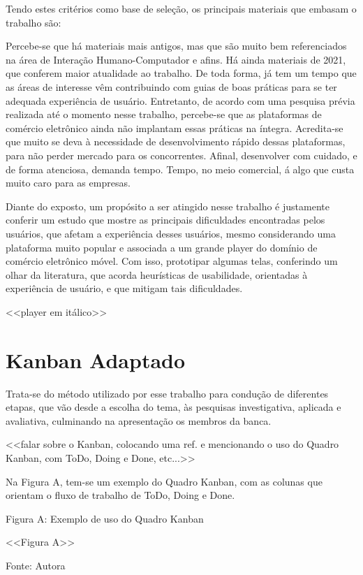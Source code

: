 Tendo estes critérios como base de seleção, os principais materiais que embasam o trabalho são:

Percebe-se que há materiais mais antigos, mas que são muito bem referenciados na área de Interação Humano-Computador e afins. Há ainda materiais de 2021, que conferem maior atualidade ao trabalho. De toda forma, já tem um tempo que as áreas de interesse vêm contribuindo com guias de boas práticas para se ter adequada experiência de usuário. Entretanto, de acordo com uma pesquisa prévia realizada até o momento nesse trabalho, percebe-se que as plataformas de comércio eletrônico ainda não implantam essas práticas na íntegra. Acredita-se que muito se deva à necessidade de desenvolvimento rápido dessas plataformas, para não perder mercado para os concorrentes. Afinal, desenvolver com cuidado, e de forma atenciosa, demanda tempo. Tempo, no meio comercial, á algo que custa muito caro para as empresas. 

Diante do exposto, um propósito a ser atingido nesse trabalho é justamente conferir um estudo que mostre as principais dificuldades encontradas pelos usuários, que afetam a experiência desses usuários, mesmo considerando uma plataforma muito popular e associada a um grande player do domínio de comércio eletrônico móvel. Com isso, prototipar algumas telas, conferindo um olhar da literatura, que acorda heurísticas de usabilidade, orientadas à experiência de usuário, e que mitigam tais dificuldades.

<<player em itálico>>


\section {Kanban Adaptado}



Trata-se do método utilizado por esse trabalho para condução de diferentes etapas, que vão desde a escolha do tema, às pesquisas investigativa, aplicada e avaliativa, culminando na apresentação os membros da banca.

<<falar sobre o Kanban, colocando uma ref. e mencionando o uso do Quadro Kanban, com ToDo, Doing e Done, etc...>>

Na Figura A, tem-se um exemplo do Quadro Kanban, com as colunas que orientam o fluxo de trabalho de ToDo, Doing e Done.

Figura A: Exemplo de uso do Quadro Kanban

<<Figura A>>

Fonte: Autora

